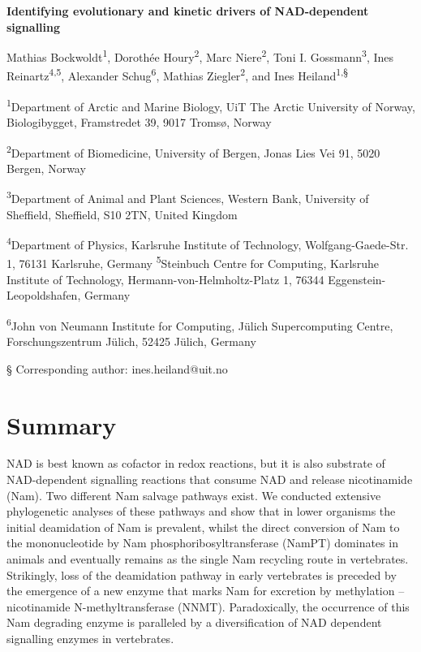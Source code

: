
\noindent
{\huge\sffamily\bfseries Identifying evolutionary and kinetic drivers of NAD-dependent signalling \par}

\vspace{5mm}

\noindent
Mathias Bockwoldt\textsuperscript{1}, Dorothée Houry\textsuperscript{2}, Marc Niere\textsuperscript{2}, Toni I. Gossmann\textsuperscript{3}, Ines Reinartz\textsuperscript{4,5}, Alexander Schug\textsuperscript{6}, Mathias Ziegler\textsuperscript{2}, and Ines Heiland\textsuperscript{1,§}

\vspace{1cm}

\noindent
\textsuperscript{1}Department of Arctic and Marine Biology, UiT The Arctic University of Norway, Biologibygget, Framstredet 39, 9017 Tromsø, Norway

\noindent
\textsuperscript{2}Department of Biomedicine, University of Bergen, Jonas Lies Vei 91, 5020 Bergen, Norway

\noindent
\textsuperscript{3}Department of Animal and Plant Sciences, Western Bank, University of Sheffield, Sheffield, S10 2TN, United Kingdom

\noindent
\textsuperscript{4}Department of Physics, Karlsruhe Institute of Technology, Wolfgang-Gaede-Str. 1, 76131 Karlsruhe, Germany
\textsuperscript{5}Steinbuch Centre for Computing, Karlsruhe Institute of Technology, Hermann-von-Helmholtz-Platz 1, 76344 Eggenstein-Leopoldshafen, Germany

\noindent
\textsuperscript{6}John von Neumann Institute for Computing, Jülich Supercomputing Centre, Forschungszentrum Jülich, 52425 Jülich, Germany

\noindent
§ Corresponding author: ines.heiland@uit.no


\section*{Summary}

NAD is best known as cofactor in redox reactions, but it is also substrate of NAD-dependent signalling reactions that consume NAD and release nicotinamide (Nam). Two different Nam salvage pathways exist. We conducted extensive phylogenetic analyses of these pathways and show that in lower organisms the initial deamidation of Nam is prevalent, whilst the direct conversion of Nam to the mononucleotide by Nam phosphoribosyltransferase (NamPT) dominates in animals and eventually remains as the single Nam recycling route in vertebrates. Strikingly, loss of the deamidation pathway in early vertebrates is preceded by the emergence of a new enzyme that marks Nam for excretion by methylation – nicotinamide N-methyltransferase (NNMT). Paradoxically, the occurrence of this Nam degrading enzyme is paralleled by a diversification of NAD dependent signalling enzymes in vertebrates.

